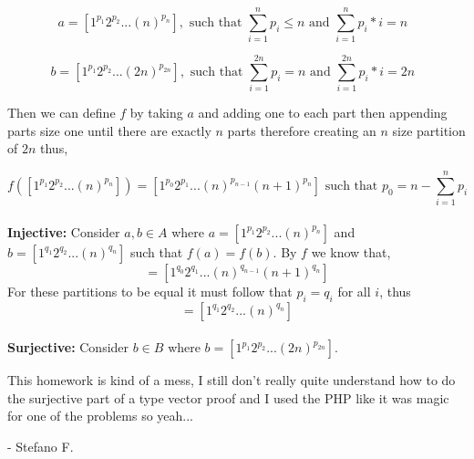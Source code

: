 \documentclass{amsart}
\begin{document}
\begin{enumerate}
\begin{equation*}
a = [1^{p_1}  2^{p_2}...(n)^{p_{n}}],  \text{ such that $\sum_{i = 1}^{n}p_i \leq n$ and $\sum_{i = 1}^{n}p_i*i = n$ }
\end{equation*}

\begin{equation*}
b = [1^{p_1}  2^{p_2}...(2n)^{p_{2n}}],  \text{ such that $\sum_{i = 1}^{2n}p_i = n$ and $\sum_{i = 1}^{2n}p_i*i = 2n$  }
\end{equation*}

Then we can define $f$ by taking $a$ and adding one to each part then appending parts size one until there are exactly $n$ parts therefore creating an $n$ size partition of $2n$ thus,

\begin{equation*}
f([1^{p_1}  2^{p_2}...(n)^{p_{n}}]) = [1^{p_0}  2^{p_1}...(n)^{p_{n-1}} (n+1)^{p_{n}}]  \text{ such that $p_0 = n-\sum_{i = 1}^{n}p_i$}
\end{equation*}\\


\noindent\textbf{Injective: } Consider $a,b \in A$ where $a = [1^{p_1}  2^{p_2}...(n)^{p_{n}}]$ and $b = [1^{q_1}  2^{q_2}...(n)^{q_{n}}]$ such that $f(a) = f(b)$. By $f$ we know that, 
\begin{equation*}
[1^{p_0}  2^{p_1}...(n)^{p_{n-1}} (n+1)^{p_{n}}] =[1^{q_0}  2^{q_1}...(n)^{q_{n-1}} (n+1)^{q_{n}}]
\end{equation*}
For these partitions to be equal it must follow that $p_i=q_i$ for all $i$, thus 
\begin{equation*}
 [1^{p_1}  2^{p_2}...(n)^{p_{n}}] = [1^{q_1}  2^{q_2}...(n)^{q_{n}}]
\end{equation*}\\

\noindent\textbf{Surjective: } Consider $b\in B$ where $b = [1^{p_1}  2^{p_2}...(2n)^{p_{2n}}]$. 


This homework is kind of a mess, I still don't really quite understand how to do the surjective part of a type vector proof and I used the PHP like it was magic for one of the problems so yeah...

- Stefano F.










\end{enumerate}
\end{document}
